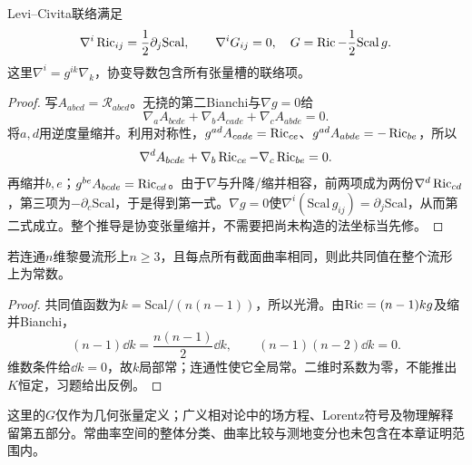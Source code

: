 \begin{theorem}[缩并Bianchi与Einstein张量]\label{thm:contracted-bianchi}
Levi--Civita联络满足
\[
 \nabla^i\operatorname{Ric}_{ij}=\frac12\partial_j\mathrm{Scal},\qquad
 \nabla^iG_{ij}=0,\quad G=\operatorname{Ric}-\frac12\mathrm{Scal}\,g.
\]
这里$\nabla^i=g^{ik}\nabla_k$，协变导数包含所有张量槽的联络项。
\end{theorem}
\begin{proof}
写$A_{abcd}=\mathcal R_{abcd}$。无挠的第二Bianchi与$\nabla g=0$给
\[
 \nabla_a A_{bcde}+\nabla_b A_{cade}+\nabla_c A_{abde}=0.
\]
将$a,d$用逆度量缩并。利用对称性，$g^{ad}A_{cade}=\operatorname{Ric}_{ce}$、$g^{ad}A_{abde}=-\operatorname{Ric}_{be}$，所以
\[
 \nabla^d A_{bcde}+\nabla_b\operatorname{Ric}_{ce}-\nabla_c\operatorname{Ric}_{be}=0.
\]
再缩并$b,e$；$g^{be}A_{bcde}=\operatorname{Ric}_{cd}$。由于$\nabla$与升降/缩并相容，前两项成为两份$\nabla^d\operatorname{Ric}_{cd}$，第三项为$-\partial_c\mathrm{Scal}$，于是得到第一式。$\nabla g=0$使$\nabla^i(\mathrm{Scal}\,g_{ij})=\partial_j\mathrm{Scal}$，从而第二式成立。整个推导是协变张量缩并，不需要把尚未构造的法坐标当先修。
\end{proof}

\begin{corollary}[Schur引理的维数条件]\label{cor:schur}
若连通$n$维黎曼流形上$n\geq3$，且每点所有截面曲率相同，则此共同值在整个流形上为常数。
\end{corollary}
\begin{proof}
共同值函数为$k=\mathrm{Scal}/(n(n-1))$，所以光滑。由$\operatorname{Ric}=(n-1)kg$及缩并Bianchi，
\[
 (n-1)\dd k=\frac{n(n-1)}2\dd k,
 \qquad (n-1)(n-2)\dd k=0.
\]
维数条件给$\dd k=0$，故$k$局部常；连通性使它全局常。二维时系数为零，不能推出$K$恒定，习题给出反例。
\end{proof}

这里的$G$仅作为几何张量定义；广义相对论中的场方程、Lorentz符号及物理解释留第五部分。常曲率空间的整体分类、曲率比较与测地变分也未包含在本章证明范围内。
